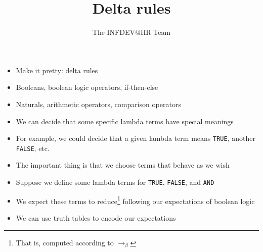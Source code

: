 \documentclass{beamer}
\title{Delta rules}
\author{The INFDEV@HR Team}
\institute{Hogeschool Rotterdam \\ 
Rotterdam, Netherlands}
\date{}
\begin{document}
\maketitle
{}
\begin{frame}[fragile]{\CurrentSection}
\begin{block}{\CurrentSubSection}
\begin{itemize}
\item Make it pretty: delta rules
\item Booleans, boolean logic operators, if-then-else
\item Naturals, arithmetic operators, comparison operators

\end{itemize}

\end{block}


\end{frame}

\begin{frame}[fragile]{\CurrentSection}
\begin{block}{\CurrentSubSection}
\begin{itemize}
\item We can decide that some specific lambda terms have special meanings
\item For example, we could decide that a given lambda term means \texttt{TRUE}, another \texttt{FALSE}, etc.
\item The important thing is that we choose terms that behave as we wish

\end{itemize}

\end{block}


\end{frame}

\begin{frame}[fragile]{\CurrentSection}
\begin{block}{\CurrentSubSection}
\begin{itemize}
\item Suppose we define some lambda terms for \texttt{TRUE}, \texttt{FALSE}, and \texttt{AND}
\item We expect these terms to reduce\footnote{That is, computed according to $\rightarrow_\beta$} following our expectations of boolean logic
\item We can use truth tables to encode our expectations

\end{itemize}

\end{block}


\end{frame}
\end{document}

